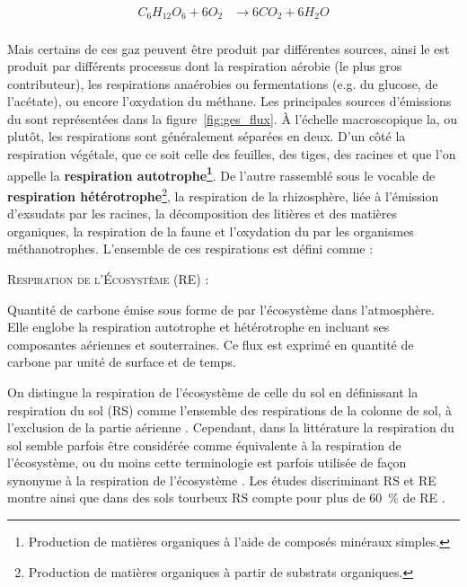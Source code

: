 $$\begin{aligned}\label{eq:respi}
C_{6}H_{12}O_{6} + 6O_{2} &\rightarrow 6CO_{2} + 6H_{2}O \\
\end{aligned} $$

Mais certains de ces gaz peuvent être produit par différentes sources, ainsi le \coo est produit par différents processus dont la respiration aérobie (le plus gros contributeur), les respirations anaérobies ou fermentations (e.g. du glucose, de l'acétate), ou encore l'oxydation du méthane.
Les principales sources d'émissions du \coo sont représentées dans la figure~\ref{fig:ges_flux}.
À l'échelle macroscopique la, ou plutôt, les respirations sont généralement séparées en deux.
D'un côté la respiration végétale, que ce soit celle des feuilles, des tiges, des racines et que l'on appelle la \textbf{respiration autotrophe\footnote{Production de matières organiques à l'aide de composés minéraux simples.}}.
De l'autre rassemblé sous le vocable de \textbf{respiration hétérotrophe}\footnote{Production de matières organiques à partir de substrats organiques.}, la respiration de la rhizosphère, liée à l'émission d'exsudats par les racines, la décomposition des litières et des matières organiques, la respiration de la faune et l'oxydation du \chh par les organismes méthanotrophes.
L'ensemble de ces respirations est défini comme : 
\begin{pdef}
\textsc{Respiration de l'Écosystème (RE)} :

Quantité de carbone émise sous forme de \coo par l'écosystème dans l'atmosphère. 
Elle englobe la respiration autotrophe et hétérotrophe en incluant ses composantes aériennes et souterraines.
Ce flux est exprimé en quantité de carbone par unité de surface et de temps.
\end{pdef}
On distingue la respiration de l'écosystème de celle du sol en définissant la respiration du sol (RS) comme l'ensemble des respirations de la colonne de sol, à l'exclusion de la partie aérienne \citep{luo20063}.
Cependant, dans la littérature la respiration du sol semble parfois être considérée comme équivalente à la respiration de l'écosystème, ou du moins cette terminologie est parfois utilisée de façon synonyme à la respiration de l'écosystème \citep{raich1992}.
Les études discriminant RS et RE montre ainsi que dans des sols tourbeux RS compte pour plus de \SI{60}{\percent} de RE \cite{lohila2003}.

